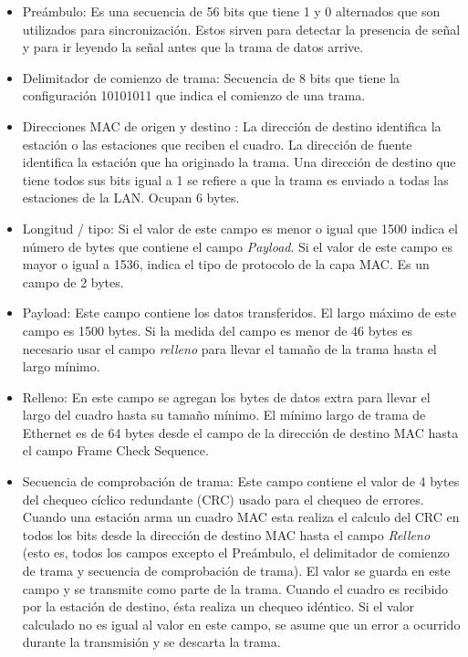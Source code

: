 \begin{itemize}
	\item Preámbulo: Es una secuencia de 56 bits que tiene 1 y 0 alternados que son utilizados para sincronización. Estos sirven para detectar la presencia de señal y para ir leyendo la señal antes que la trama de datos arrive.

	\item Delimitador de comienzo de trama: Secuencia de 8 bits que tiene la configuración 10101011 que indica el comienzo de una trama.

	\item Direcciones MAC de origen y destino : La dirección de destino identifica la estación o las estaciones que reciben el cuadro. La dirección de fuente identifica la estación que ha originado la trama.
Una dirección de destino que tiene todos sus bits igual a 1 se refiere a que la trama es enviado a todas las estaciones de la LAN. Ocupan 6 bytes.

	\item Longitud / tipo: Si el valor de este campo es menor o igual que 1500 indica el número de bytes que contiene el campo \textit{Payload}. Si el valor de este campo es mayor o igual a 1536, indica el tipo de protocolo de la capa MAC. Es un campo de 2 bytes.

	\item Payload: Este campo contiene los datos transferidos. El largo máximo de este campo es 1500 bytes. Si la medida del campo es menor de 46 bytes es necesario usar el campo \textit{relleno} para llevar el tamaño de la trama hasta el largo mínimo.

	\item Relleno: En este campo se  agregan los bytes de datos extra para llevar el largo del cuadro hasta su tamaño mínimo. El mínimo largo de trama de Ethernet es de 64 bytes desde el campo de la dirección de destino MAC hasta el campo Frame Check Sequence.

	\item Secuencia de comprobación de trama: Este campo contiene el valor de 4 bytes del chequeo cíclico redundante (CRC) usado para el chequeo de errores. Cuando una estación arma un cuadro MAC esta realiza el calculo del CRC en todos los bits desde la dirección de destino MAC hasta el campo \textit{Relleno} (esto es, todos los campos excepto el Preámbulo, el delimitador de comienzo de trama y secuencia de comprobación de trama). El valor se guarda en este campo y se transmite como parte de la trama. Cuando el cuadro es recibido por la estación de destino, ésta realiza un chequeo idéntico. Si el valor calculado no es igual al valor en este campo, se asume que un error a ocurrido durante la transmisión y se descarta la trama.
\end{itemize}


